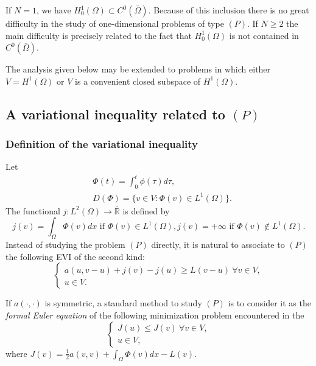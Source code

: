 \begin{remark}\label{c4:rem2.1}%
If $N=1$, we have  $H^1_0 (\Omega) \subset C^0 (\overline{\Omega})$. Because of this inclusion there is no great difficulty in the study of one-dimensional problems of type $(P)$. If $N \geq 2$ the main difficulty is precisely related to the fact that $H^1_0 (\Omega)$ is not contained in $C^0 (\overline{\Omega})$.
\end{remark}

\begin{remark}\label{c4:rem2.2}%
The analysis given below may be extended to problems in which either $V = H^1 (\Omega)$ or $V$  is a convenient closed subspace of $H^1(\Omega)$.
\end{remark}

\subsection{A variational inequality related to $(P)$}\label{c4:ss2.2}

\subsubsection {Definition of the variational 
inequality}\label{c4:sss2.2.1}\pageoriginale 

Let 
\begin{align}
& \Phi (t) = \int_0^t \phi (\tau) d \tau, \tag{2.7}\label{c4:eq2.7}\\
& D (\Phi) = \{v \in V : \Phi (v) \in L^1 (\Omega)\}.
\end{align}
The functional $j : L^2 (\Omega) \to \overline{\mathbb{R}}$ is defined by
\begin{equation}
j (v) = \int_\Omega \Phi (v) dx \text{ if } \Phi (v) \in L^1 (\Omega), j (v) = + \infty \text{ if } \Phi (v) \notin L^1 (\Omega).
\end{equation}
Instead of studying the problem $(P)$ directly, it is natural to associate to $(P)$ the following EVI of the second kind:
\begin{equation}
\begin{cases}
a (u, v-u) + j (v) -j (u) \geq L (v -u) \ \forall v \in V,\\
u \in V. \tag{$\pi$}
\end{cases}
\end{equation}

If $a (\cdot, \cdot)$ is symmetric, a standard method to study $(P)$ is to consider it as the \textit{formal Euler equation} of the following minimization problem encountered in the 
\begin{equation}
\begin{cases}
J (u) \leq J (v) \ \forall v \in V, \\
u \in V, \tag{2.10}\label{c4:eq2.10}
\end{cases}
\end{equation}
where $J (v) = \frac{1}{2} a (v, v) + \int_\Omega \Phi (v) dx - L (v)$.

